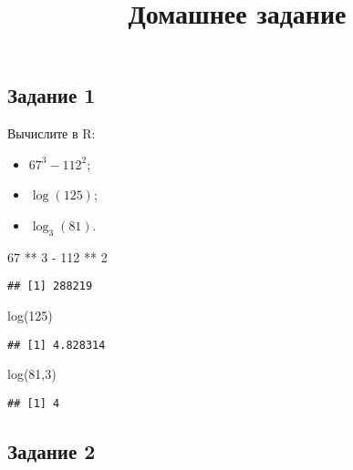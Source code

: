 \documentclass[
]{article}
\title{Домашнее задание}
\author{}
\date{\vspace{-2.5em}}
\newenvironment{Shaded}{\begin{snugshade}}{\end{snugshade}}
\newcommand{\DecValTok}[1]{\textcolor[rgb]{0.00,0.00,0.81}{#1}}
\newcommand{\FunctionTok}[1]{\textcolor[rgb]{0.00,0.00,0.00}{#1}}
\newcommand{\NormalTok}[1]{#1}
\newcommand{\SpecialCharTok}[1]{\textcolor[rgb]{0.00,0.00,0.00}{#1}}
\providecommand{\tightlist}{%
  \setlength{\itemsep}{0pt}\setlength{\parskip}{0pt}}
\begin{document}
\maketitle

\hypertarget{ux437ux430ux434ux430ux43dux438ux435-1}{%
\subsection{Задание 1}\label{ux437ux430ux434ux430ux43dux438ux435-1}}

Вычислите в R:

\begin{itemize}
\tightlist
\item
  \(67 ^ 3 - 112 ^ 2\);
\item
  \(\log(125)\);
\item
  \(\log_3(81)\).
\end{itemize}

\begin{Shaded}
\begin{Highlighting}[]
\DecValTok{67} \SpecialCharTok{**} \DecValTok{3} \SpecialCharTok{{-}} \DecValTok{112} \SpecialCharTok{**} \DecValTok{2}
\end{Highlighting}
\end{Shaded}

\begin{verbatim}
## [1] 288219
\end{verbatim}

\begin{Shaded}
\begin{Highlighting}[]
\FunctionTok{log}\NormalTok{(}\DecValTok{125}\NormalTok{)}
\end{Highlighting}
\end{Shaded}

\begin{verbatim}
## [1] 4.828314
\end{verbatim}

\begin{Shaded}
\begin{Highlighting}[]
\FunctionTok{log}\NormalTok{(}\DecValTok{81}\NormalTok{,}\DecValTok{3}\NormalTok{)}
\end{Highlighting}
\end{Shaded}

\begin{verbatim}
## [1] 4
\end{verbatim}

\hypertarget{ux437ux430ux434ux430ux43dux438ux435-2}{%
\subsection{Задание 2}\label{ux437ux430ux434ux430ux43dux438ux435-2}}
\end{document}
